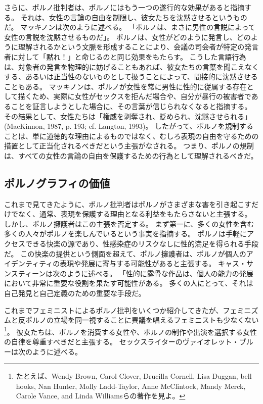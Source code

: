\documentclass[paper=a4,book,openany]{jlreq}
\begin{document}
さらに、ポルノ批判者は、ポルノにはもう一つの遂行的な効果があると指摘する。
それは、女性の言論の自由を制限し、彼女たちを沈黙させるというものだ。
マッキノンは次のように述べる。
「ポルノは、まさに男性の言説によって女性の言説を沈黙させるものだ」\citep[pp. 209--209]{mackinnon87:_femin_unmod}。
ポルノは、女性がどのように発言し、どのように理解されるかという文脈を形成することにより、会議の司会者が特定の発言者に対して「黙れ！」と命じるのと同じ効果をもたらす。
こうした言語行為は、対象者の発言を物理的に妨げることもあれば、彼女たちの言葉を聞こえなくする、あるいは正当性のないものとして扱うことによって、間接的に沈黙させることもある。
マッキノンは、ポルノが女性を常に男性に性的に従属する存在として描くため、実際に女性がセックスを拒んだ場合や、自分が暴行の被害者であることを証言しようとした場合に、その言葉が信じられなくなると指摘する。
その結果として、女性たちは「権威を剥奪され、貶められ、沈黙させられる」(MacKinnon, 1987, p. 193; cf. Langton, 1993)\nocite{langton93:_speec_acts_and_unspeak_acts}。
したがって、ポルノを規制することは、単に道徳的な理由によるものではなく、むしろ表現の自由を守るための措置として正当化されるべきだという主張がなされる。
つまり、ポルノの規制は、すべての女性の言論の自由を保護するための行為として理解されるべきだ。

\subsection{ポルノグラフィの価値}

これまで見てきたように、ポルノ批判者はポルノがさまざまな害を引き起こすだけでなく、通常、表現を保護する理由となる利益をもたらさないと主張する。
しかし、ポルノ擁護者はこの主張を否定する。
まず第一に、多くの女性を含む多くの人々がポルノを楽しんでいるという事実を指摘する。
ポルノは手軽にアクセスできる快楽の源であり、性感染症のリスクなしに性的満足を得られる手段だ。
この快楽の提供という側面を超えて、ポルノ擁護者は、ポルノが個人のアイデンティティの表現や発展に寄与する可能性があると主張する。
キャス・サンスティーンは次のように述べる。
「性的に露骨な作品は、個人の能力の発展において非常に重要な役割を果たす可能性がある。
多くの人にとって、それは自己発見と自己定義のための重要な手段だ\citep[p.215]{sunstein95:_democ_probl_free_speec}。

これまでフェミニストによるポルノ批判をいくつか紹介してきたが、フェミニズムと反ポルノの立場を同一視することに異議を唱えるフェミニストも少なくない
\footnote{たとえば、Wendy Brown, Carol Clover, Drucilla Cornell, Lisa Duggan, bell hooks, Nan Hunter, Molly Ladd-Taylor, Anne McClintock, Mandy Merck, Carole Vance, and Linda Williamsらの著作を見よ。
}。
彼女たちは、ポルノを消費する女性や、ポルノの制作や出演を選択する女性の自律を尊重すべきだと主張する。
セックスライターのヴァイオレット・ブルーは次のように述べる。
\end{document}
